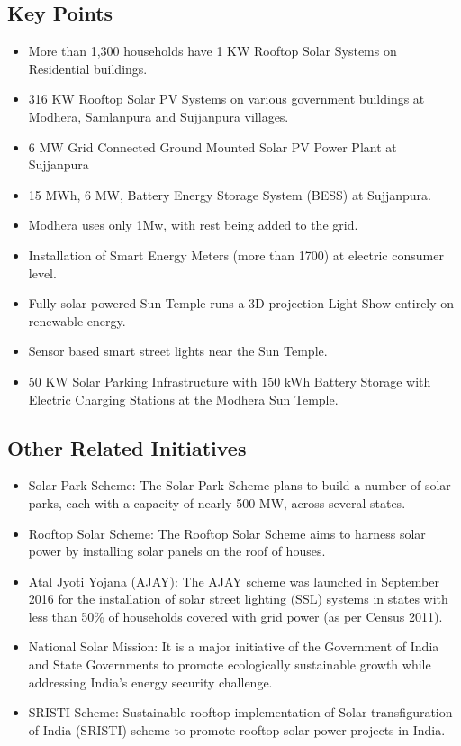 \documentclass[11pt]{article}
\begin{document}
\subsection{Key Points}
\label{sec:org56fe35c}
\begin{itemize}
\item More than 1,300 households have 1 KW Rooftop Solar Systems on Residential buildings.
\item 316 KW Rooftop Solar PV Systems on various government buildings at Modhera, Samlanpura and Sujjanpura villages.
\item 6 MW Grid Connected Ground Mounted Solar PV Power Plant at Sujjanpura
\item 15 MWh, 6 MW, Battery Energy Storage System (BESS) at Sujjanpura.
\item Modhera uses only 1Mw, with rest being added to the grid.
\item Installation of Smart Energy Meters (more than 1700) at electric consumer level.
\item Fully solar-powered Sun Temple runs a 3D projection Light Show entirely on renewable energy.
\item Sensor based smart street lights near the Sun Temple.
\item 50 KW Solar Parking Infrastructure with 150 kWh Battery Storage with Electric Charging Stations at the Modhera Sun Temple.
\end{itemize}

\subsection{Other Related Initiatives}
\label{sec:org54d062a}
\begin{itemize}
\item Solar Park Scheme: The Solar Park Scheme plans to build a number of solar parks, each with a capacity of nearly 500 MW, across several states.
\item Rooftop Solar Scheme: The Rooftop Solar Scheme aims to harness solar power by installing solar panels on the roof of houses.
\item Atal Jyoti Yojana (AJAY): The AJAY scheme was launched in September 2016 for the installation of solar street lighting (SSL) systems in states with less than 50\% of households covered with grid power (as per Census 2011).
\item National Solar Mission: It is a major initiative of the Government of India and State Governments to promote ecologically sustainable growth while addressing India's energy security challenge.
\item SRISTI Scheme: Sustainable rooftop implementation of Solar transfiguration of India (SRISTI) scheme to promote rooftop solar power projects in India.
\end{itemize}
\end{document}
